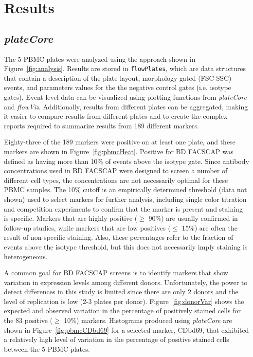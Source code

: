 \documentclass[12pt]{article}
\newcommand{\Robject}[1]{{\texttt{#1}}}
\newcommand{\Rpackage}[1]{{\textit{#1}}}
\begin{document}
\clearpage
\section*{Results}
\subsection*{\Rpackage{plateCore}}
The 5 PBMC plates were analyzed using the approach shown in Figure~\ref{fig:analysis}.  Results
are stored in \Robject{flowPlates}, which are data structures that contain a description of the
plate layout, morphology gated (FSC-SSC) events, and parameters values for the 
the negative control gates (i.e. isotype gates). Event level data can be 
visualized using plotting functions from \Rpackage{plateCore} and \Rpackage{flowViz}. 
Additionally, results from different plates can be aggregated, making it easier to compare
results from different plates and to create the complex reports required to summarize results from 
189 different markers.

Eighty-three of the 189 markers were positive on at least one plate, and these markers are 
shown in Figure~\ref{fig:pbmcHeat}. Positive for BD FACS\texttrademark CAP was defined as having more than 10\% of
events above the isotype gate. Since antibody concentrations used in BD FACS\texttrademark CAP were designed
to screen a number of different cell types, the concentrations are not necessarily optimal for these PBMC samples. 
The 10\% cutoff is an empirically determined threshold (data not shown) used to select markers for further analysis,
including single color titration and competition experiments to confirm that the marker is present
and staining is specific. Markers that are highly positive ($\ge$ 90\%) are usually confirmed in
follow-up studies, while markers that are low positives ($\le$ 15\%) are often the result of non-specific
staining. Also, these percentages refer to the fraction of events above the isotype threshold, but
this does not necessarily imply staining is heterogeneous.

A common goal for BD FACS\texttrademark CAP screens is to identify markers that show variation in expression levels
among different donors. Unfortunately, the power to detect differences in this study is limited since there are
only 2 donors and the level of replication is low (2-3 plates per donor). Figure~\ref{fig:donorVar} shows 
the expected and observed variation in the percentage of positively stained cells for the
83 positive ($\ge$ 10\%) markers. Histograms produced using \Rpackage{plateCore} are shown in Figure~\ref{fig:pbmcCDbd69}
for a selected marker, CDbd69, that exhibited a relatively high level of variation in the percentage of positive stained cells
between the 5 PBMC plates.
\end{document}
